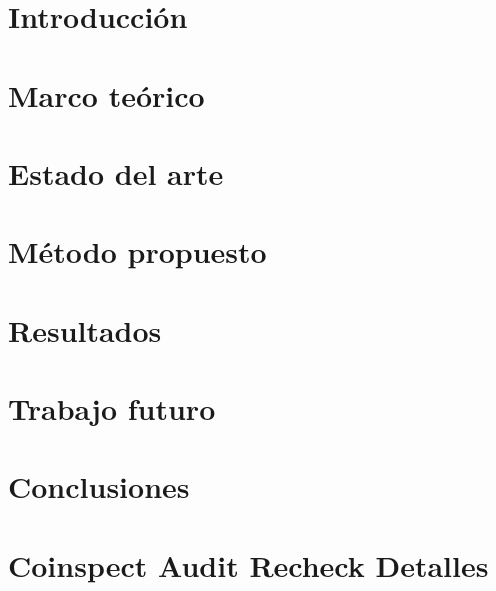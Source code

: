 \documentclass[a4paper, twoside]{report}
\begin{document}



 
 
 
\tableofcontents


\chapter{Introducción}

\label{chap:introduccion}
\chapter{Marco teórico}

\label{chap:marco}
\chapter{Estado del arte}

\label{chap:estado}
\chapter{Método propuesto}

\label{chap:metodo}
\chapter{Resultados}

\label{chap:resultados}
\chapter{Trabajo futuro}

\label{chap:trabajo}
\chapter{Conclusiones}

\label{chap:conclusiones}
\appendix
\chapter{Coinspect Audit Recheck Detalles}

\printbibliography
\end{document}
